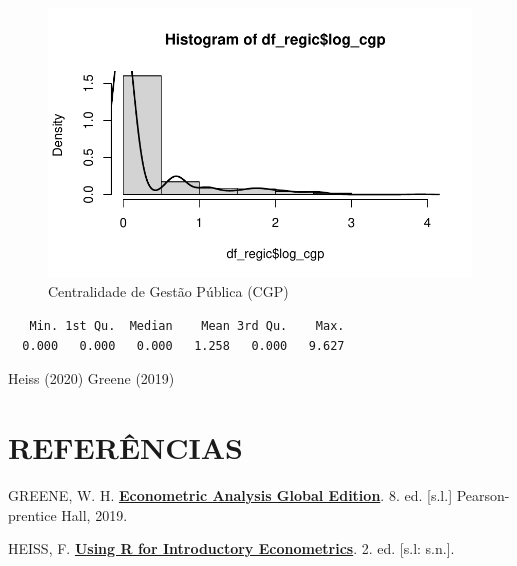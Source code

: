 \documentclass[a4paper,12pt]{article}
\newenvironment{Shaded}{\begin{snugshade}}{\end{snugshade}}
\newcommand{\FunctionTok}[1]{\textcolor[rgb]{0.39,0.29,0.61}{#1}}
\newcommand{\NormalTok}[1]{\textcolor[rgb]{0.12,0.11,0.11}{#1}}
\newcommand{\SpecialCharTok}[1]{\textcolor[rgb]{0.24,0.68,0.91}{#1}}
\newlength{\cslhangindent}
\newlength{\cslentryspacingunit} %
\newenvironment{CSLReferences}[2] %
 {%
  \setlength{\parindent}{0pt}
  \ifodd #1
  \let\oldpar\par
  \def\par{\hangindent=\cslhangindent\oldpar}
  \fi
  \setlength{\parskip}{#2\cslentryspacingunit}
 }%
 {}
\begin{document}
\begin{figure}[H]

\caption{Centralidade de Gestão Pública (CGP)}

{\centering \includegraphics{main_files/figure-pdf/unnamed-chunk-7-1.pdf}

}

\end{figure}

\begin{Shaded}
\end{Shaded}

\begin{verbatim}
   Min. 1st Qu.  Median    Mean 3rd Qu.    Max. 
  0.000   0.000   0.000   1.258   0.000   9.627 
\end{verbatim}

Heiss (2020) Greene (2019)

\newpage

\hypertarget{referuxeancias}{%
\section{REFERÊNCIAS}\label{referuxeancias}}

\singlespacing

\hypertarget{refs}{}
\begin{CSLReferences}{0}{1}
\leavevmode{}%
GREENE, W. H.
\textbf{\href{http://gen.lib.rus.ec/book/index.php?md5=2BB86D2F4CF47DB0A519E94D262C3331}{Econometric
Analysis Global Edition}}. 8. ed. {[}s.l.{]} Pearson-prentice Hall,
2019.

\leavevmode{}%
HEISS, F.
\textbf{\href{http://gen.lib.rus.ec/book/index.php?md5=5C3417608D22D155EA90339688548999}{Using
R for Introductory Econometrics}}. 2. ed. {[}s.l: s.n.{]}.

\end{CSLReferences}
\end{document}
